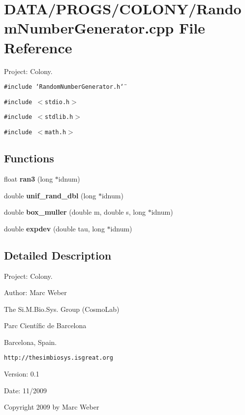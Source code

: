 \section{DATA/PROGS/COLONY/RandomNumberGenerator.cpp File Reference}
\label{RandomNumberGenerator_8cpp}
Project: Colony. 

{\tt \#include \char`\"{}RandomNumberGenerator.h\char`\"{}}\par
{\tt \#include $<$stdio.h$>$}\par
{\tt \#include $<$stdlib.h$>$}\par
{\tt \#include $<$math.h$>$}\par
\subsection*{Functions}
\begin{CompactItemize}
\item 
float {\bf ran3} (long $\ast$idnum)
\item 
double {\bf unif\_\-rand\_\-dbl} (long $\ast$idnum)
\item 
double {\bf box\_\-muller} (double m, double s, long $\ast$idnum)
\item 
double {\bf expdev} (double tau, long $\ast$idnum)
\end{CompactItemize}


\subsection{Detailed Description}
Project: Colony. 

\begin{Desc}
\item[Author:]Marc Weber\par
 The Si.M.Bio.Sys. Group (CosmoLab)\par
 Parc Científic de Barcelona\par
 Barcelona, Spain.\par
 {\tt http://thesimbiosys.isgreat.org} \end{Desc}
\begin{Desc}
\item[Version:]0.1 \end{Desc}
\begin{Desc}
\item[Date:]11/2009\end{Desc}
Copyright 2009 by Marc Weber 

